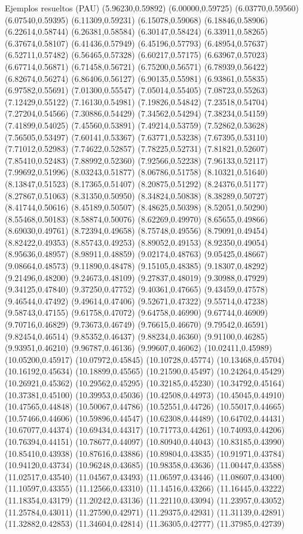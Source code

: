 \documentclass[11pt,a4paper]{article}
\begin{document}
\begin{fmex}{Ejemplos resueltos (PAU)}
(5.96230,0.59892) (6.00000,0.59725) (6.03770,0.59560) (6.07540,0.59395) (6.11309,0.59231) (6.15078,0.59068) (6.18846,0.58906) (6.22614,0.58744) (6.26381,0.58584) (6.30147,0.58424) (6.33911,0.58265) (6.37674,0.58107) (6.41436,0.57949) (6.45196,0.57793) (6.48954,0.57637) (6.52711,0.57482) (6.56465,0.57328) (6.60217,0.57175) (6.63967,0.57023) (6.67714,0.56871) (6.71458,0.56721) (6.75200,0.56571) (6.78939,0.56422) (6.82674,0.56274) (6.86406,0.56127) (6.90135,0.55981) (6.93861,0.55835) (6.97582,0.55691) (7.01300,0.55547) (7.05014,0.55405) (7.08723,0.55263) (7.12429,0.55122) (7.16130,0.54981) (7.19826,0.54842) (7.23518,0.54704) (7.27204,0.54566) (7.30886,0.54429) (7.34562,0.54294) (7.38234,0.54159) (7.41899,0.54025) (7.45560,0.53891) (7.49214,0.53759) (7.52862,0.53628) (7.56505,0.53497) (7.60141,0.53367) (7.63771,0.53238) (7.67395,0.53110) (7.71012,0.52983) (7.74622,0.52857) (7.78225,0.52731) (7.81821,0.52607) (7.85410,0.52483) (7.88992,0.52360) (7.92566,0.52238) (7.96133,0.52117) (7.99692,0.51996) (8.03243,0.51877) (8.06786,0.51758) (8.10321,0.51640) (8.13847,0.51523) (8.17365,0.51407) (8.20875,0.51292) (8.24376,0.51177) (8.27867,0.51063) (8.31350,0.50950) (8.34824,0.50838) (8.38289,0.50727) (8.41744,0.50616) (8.45189,0.50507) (8.48625,0.50398) (8.52051,0.50290) (8.55468,0.50183) (8.58874,0.50076) (8.62269,0.49970) (8.65655,0.49866) (8.69030,0.49761) (8.72394,0.49658) (8.75748,0.49556) (8.79091,0.49454) (8.82422,0.49353) (8.85743,0.49253) (8.89052,0.49153) (8.92350,0.49054) (8.95636,0.48957) (8.98911,0.48859) (9.02174,0.48763) (9.05425,0.48667) (9.08664,0.48573) (9.11890,0.48478) (9.15105,0.48385) (9.18307,0.48292) (9.21496,0.48200) (9.24673,0.48109) (9.27837,0.48019) (9.30988,0.47929) (9.34125,0.47840) (9.37250,0.47752) (9.40361,0.47665) (9.43459,0.47578) (9.46544,0.47492) (9.49614,0.47406) (9.52671,0.47322) (9.55714,0.47238) (9.58743,0.47155) (9.61758,0.47072) (9.64758,0.46990) (9.67744,0.46909) (9.70716,0.46829) (9.73673,0.46749) (9.76615,0.46670) (9.79542,0.46591) (9.82454,0.46514) (9.85352,0.46437) (9.88234,0.46360) (9.91100,0.46285) (9.93951,0.46210) (9.96787,0.46136) (9.99607,0.46062) (10.02411,0.45989) (10.05200,0.45917) (10.07972,0.45845) (10.10728,0.45774) (10.13468,0.45704) (10.16192,0.45634) (10.18899,0.45565) (10.21590,0.45497) (10.24264,0.45429) (10.26921,0.45362) (10.29562,0.45295) (10.32185,0.45230) (10.34792,0.45164) (10.37381,0.45100) (10.39953,0.45036) (10.42508,0.44973) (10.45045,0.44910) (10.47565,0.44848) (10.50067,0.44786) (10.52551,0.44726) (10.55017,0.44665) (10.57466,0.44606) (10.59896,0.44547) (10.62308,0.44489) (10.64702,0.44431) (10.67077,0.44374) (10.69434,0.44317) (10.71773,0.44261) (10.74093,0.44206) (10.76394,0.44151) (10.78677,0.44097) (10.80940,0.44043) (10.83185,0.43990) (10.85410,0.43938) (10.87616,0.43886) (10.89804,0.43835) (10.91971,0.43784) (10.94120,0.43734) (10.96248,0.43685) (10.98358,0.43636) (11.00447,0.43588) (11.02517,0.43540) (11.04567,0.43493) (11.06597,0.43446) (11.08607,0.43400) (11.10597,0.43355) (11.12566,0.43310) (11.14516,0.43266) (11.16445,0.43222) (11.18354,0.43179) (11.20242,0.43136) (11.22110,0.43094) (11.23957,0.43052) (11.25784,0.43011) (11.27590,0.42971) (11.29375,0.42931) (11.31139,0.42891) (11.32882,0.42853) (11.34604,0.42814) (11.36305,0.42777) (11.37985,0.42739) 
\end{fmex}
\end{document}
